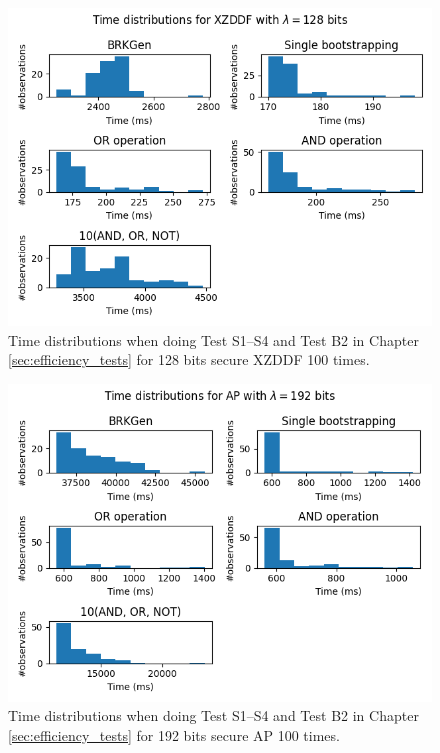 \begin{figure}[ht]
    \centering
    \includegraphics[width=\textwidth]{data/figures/XZDDF_STD128_distributions.png}
    \caption{Time distributions when doing Test S1--S4 and Test B2 in Chapter \ref{sec:efficiency_tests} for 128 bits secure XZDDF 100 times.}
    \label{fig:distr_xzddf128}
\end{figure}

\begin{figure}[ht]
    \centering
    \includegraphics[width=\textwidth]{data/figures/AP_STD192_distributions.png}
    \caption{Time distributions when doing Test S1--S4 and Test B2 in Chapter \ref{sec:efficiency_tests} for 192 bits secure AP 100 times.}
    \label{fig:distr_ap192}
\end{figure}

